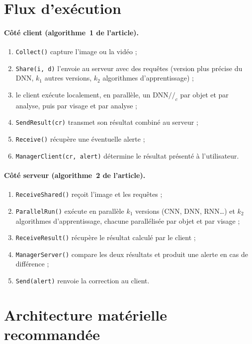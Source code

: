 \documentclass[11pt,a4paper]{report}
\newcommand{\dnnc}{\ensuremath{\mathrm{DNN}/\!/_{c}}}
\newcommand{\ms}[1]{\texttt{#1}}
\begin{document}
\section{Flux d'exécution}

\paragraph{Côté client (algorithme~1 de l'article).}
\begin{enumerate}
  \item \ms{Collect()} capture l'image ou la vidéo ;
  \item \ms{Share(i, d)} l'envoie au serveur avec des requêtes (version plus précise du DNN, $k_1$ autres versions, $k_2$ algorithmes d'apprentissage) ;
  \item le client exécute localement, en parallèle, un \dnnc{} par objet et par analyse, puis par visage et par analyse ;
  \item \ms{SendResult(cr)} transmet son résultat combiné au serveur ;
  \item \ms{Receive()} récupère une éventuelle alerte ;
  \item \ms{ManagerClient(cr, alert)} détermine le résultat présenté à l'utilisateur.
\end{enumerate}

\paragraph{Côté serveur (algorithme~2 de l'article).}
\begin{enumerate}
  \item \ms{ReceiveShared()} reçoit l'image et les requêtes ;
  \item \ms{ParallelRun()} exécute en parallèle $k_1$ versions (CNN, DNN, RNN\ldots) et $k_2$ algorithmes d'apprentissage, chacune parallélisée par objet et par visage ;
  \item \ms{ReceiveResult()} récupère le résultat calculé par le client ;
  \item \ms{ManagerServer()} compare les deux résultats et produit une alerte en cas de différence ;
  \item \ms{Send(alert)} renvoie la correction au client.
\end{enumerate}

\section{Architecture matérielle recommandée}
\end{document}
